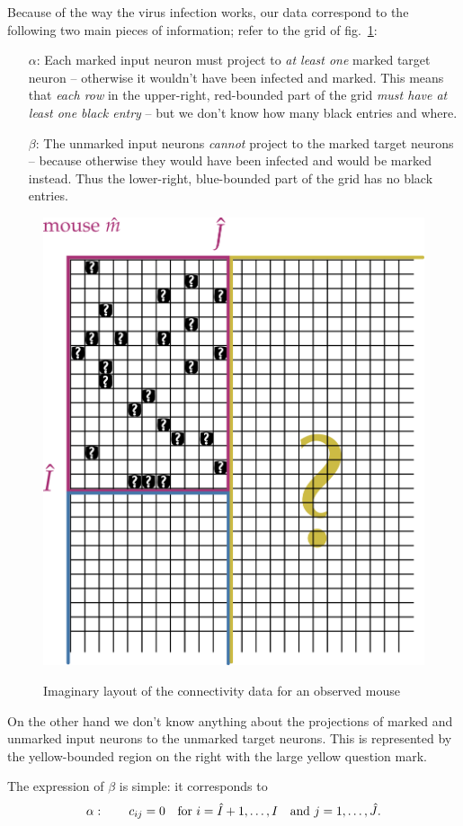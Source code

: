 \documentclass[\ifafour a4paper,12pt,\else a5paper,10pt,\fi%
onecolumn,oneside,article,%
british%
]{memoir}
\theoremstyle{remark}
\theoremstyle{innote}
\renewcommand*{\|}[1][]{\nonscript\,#1\vert\nonscript\;\mathopen{}}
\newcommand*{\fig}{fig.}%
\newcommand*{\yIh}{\Hat{I}}
\newcommand*{\yJh}{\Hat{J}}
\newcommand*{\ka}{\alpha}
\newcommand*{\kb}{\beta}
\begin{document}
Because of the way the virus infection works, our data correspond to the
following two main pieces of information; refer to the grid of
\fig~\ref{fig:datamouse}:
\begin{itemize}
\item[\textcolor{myred}{$\ka$}:] Each marked input neuron must project to
  \emph{at least one} marked target neuron -- otherwise it wouldn't have
  been infected and marked. This means that \emph{each row} in the
  upper-right, \textcolor{myred}{red-bounded} part of the grid \emph{must
    have at least one black entry} -- but we don't know how many black
  entries and where.
\item[\textcolor{mypurpleblue}{$\kb$}:] The unmarked input neurons
  \emph{cannot} project to the marked target neurons -- because otherwise
  they would have been infected and would be marked instead. Thus the
  lower-right, \textcolor{mypurpleblue}{blue-bounded} part of the grid has
  no black entries.
\end{itemize}
\begin{figure}[t!]%
 \centering\includegraphics[width=0.5\linewidth]{data_mouse2.png}\\
 \caption{Imaginary layout of the connectivity data for an observed mouse}\label{fig:datamouse}
\end{figure}%
On the other hand we don't know anything about the projections of marked
and unmarked input neurons to the unmarked target neurons. This is
represented by the \textcolor{myyellow}{yellow-bounded} region on the right
with the large yellow question mark.

The expression of $\kb$ is simple: it corresponds to
\begin{equation}
  \label{eq:alpha_and}
\ka:\qquad  c_{ij} =0 \quad\text{for }i=\yIh+1,\dotsc, I
  \quad\text{and }j=1,\dotsc,\yJh.
\end{equation}
\end{document}
